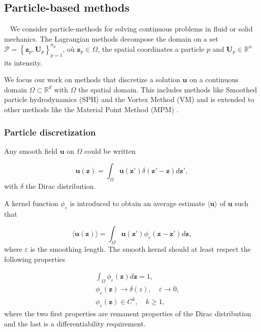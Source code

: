 
\subsection{Particle-based methods}~\label{Background_Part}
We consider particle-methods for solving continuous problems in fluid or solid mechanics. The Lagrangian methods decompose the domain on a set $\mathcal P = \left\{\bm z_p, \bm U_p\right\}_{p = 1}^{n_p}$, où $\bm z_p \in \Omega$, the spatial coordinates a particle $p$ and $\bm U_p \in \mathbb{R}^n$ its intensity.


We focus our work on methods that discretize a solution $\bm u$ on a continuous domain $\Omega \subset \mathbb{R}^d$ with $\Omega$ the spatial domain. This includes methods like Smoothed particle hydrodynamics (SPH) \cite{gingold_monaghan_sph_1977,lucy_1977} and the Vortex Method (VM) \cite{cottet_vortex_2000} and is extended to other methods like the Material Point Method (MPM) \cite{sulsky_particle_1994}.

\subsubsection{Particle discretization}

Any smooth field $\bm u$ on $\Omega$ could be written

\begin{equation*}
	\bm u(\bm z) = \int_{\Omega} \bm u(\bm z') \delta(\bm z' - \bm z)  d\bm z',
\end{equation*}with $\delta$ the Dirac distribution.

A kernel function $\phi_\varepsilon$ is introduced to obtain an average estimate $\langle \bm u \rangle$ of $\bm u$ such that

\begin{equation*}
	\langle \bm u(\bm z) \rangle = \int_{\Omega} \bm u(\bm z') \phi_\varepsilon(\bm z-\bm z') d\bm z,
\end{equation*}where $\varepsilon$ is the smoothing length. The smooth kernel should at least respect the following properties

\begin{eqnarray*}
	&& \int_{\Omega} \phi_\varepsilon(\bm z) d\bm z = 1,      \\
	&& \phi_\varepsilon(\bm z) \to \delta(z), \quad \varepsilon \to 0, \\
	&& \phi_\varepsilon(\bm z) \in C^k,  \quad k \geq 1,
\end{eqnarray*} where the two first properties are remanent properties of the Dirac distribution and the last is a differentiability requirement.


